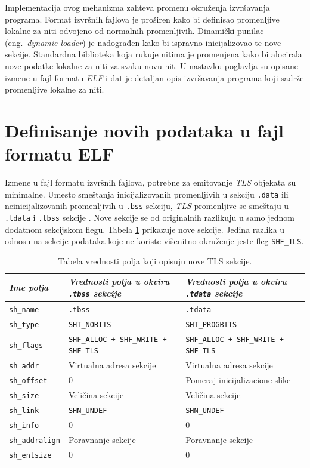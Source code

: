 \documentclass[12pt,oneside]{memoir}
\begin{document}
Implementacija ovog mehanizma zahteva promenu okruženja izvršavanja programa. Format izvršnih fajlova je proširen kako bi definisao promenljive lokalne za niti odvojeno od normalnih promenljivih. Dinamički punilac (eng.~\emph{dynamic loader}) je nadograđen kako bi ispravno inicijalizovao te nove sekcije. Standardna biblioteka koja rukuje nitima je promenjena kako bi alocirala nove podatke lokalne za niti za svaku novu nit. U nastavku poglavlja su opisane izmene u fajl formatu
\emph{ELF} i dat je detaljan opis izvršavanja programa koji sadrže promenljive lokalne za niti.

\section{Definisanje novih podataka u fajl formatu ELF}

Izmene u fajl formatu izvršnih fajlova, potrebne za emitovanje \emph{TLS} objekata su minimalne. Umesto smeštanja inicijalizovanih promenljivih u sekciju \texttt{.data} ili neinicijalizovanih promenljivih u \texttt{.bss} sekciju, \emph{TLS} promenljive se smeštaju u \texttt{.tdata} i \texttt{.tbss} sekcije \cite{TLS}. Nove sekcije se od originalnih razlikuju u samo jednom dodatnom sekcijskom flegu. Tabela \ref{tab:tls_secs} prikazuje nove sekcije. Jedina razlika u odnosu na sekcije podataka koje ne koriste višenitno okruženje jeste fleg \texttt{SHF\_TLS}.


\begin{table}
		\begin{center}
	\begin{tabular}{ | l | p{5cm} | p{5cm} |}
		\hline
		\emph{Ime polja} & \emph{Vrednosti polja u okviru \texttt{.tbss} sekcije} & \emph{Vrednosti polja u okviru \texttt{.tdata} sekcije} \\ \hline
		\texttt{sh\_name} & \texttt{.tbss} & \texttt{.tdata} \\ \hline
		\texttt{sh\_type} & \texttt{SHT\_NOBITS} & \texttt{SHT\_PROGBITS} \\ \hline
		\texttt{sh\_flags} & \texttt{SHF\_ALLOC + SHF\_WRITE + SHF\_TLS} & \texttt{SHF\_ALLOC + SHF\_WRITE + SHF\_TLS} \\ \hline
		\texttt{sh\_addr} & Virtualna adresa sekcije & Virtualna adresa sekcije \\ \hline
		\texttt{sh\_offset} & 0 & Pomeraj inicijalizacione slike \\ \hline
		\texttt{sh\_size} & Veličina sekcije & Veličina sekcije \\ \hline
		\texttt{sh\_link} & \texttt{SHN\_UNDEF} & \texttt{SHN\_UNDEF} \\ \hline
		\texttt{sh\_info} & 0 & 0 \\ \hline
		\texttt{sh\_addralign} & Poravnanje sekcije & Poravnanje sekcije \\ \hline
		\texttt{sh\_entsize} & 0 & 0 \\ \hline
	\end{tabular}
	\end{center}
	\caption{\label{tab:tls_secs}Tabela vrednosti polja koji opisuju nove TLS sekcije.}
\end{table}
\end{document}
